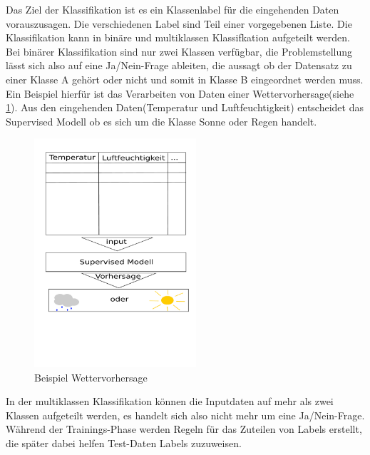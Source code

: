 	Das Ziel der Klassifikation ist es ein Klassenlabel für die eingehenden Daten vorauszusagen. Die verschiedenen Label sind Teil einer vorgegebenen Liste. \cite{Mueller2016} Die Klassifikation kann in binäre und multiklassen Klassifkation aufgeteilt werden. Bei binärer Klassifikation sind nur zwei Klassen verfügbar, die Problemstellung lässt sich also auf eine Ja/Nein-Frage ableiten, die aussagt ob der Datensatz zu einer Klasse A gehört oder nicht und somit in Klasse B eingeordnet werden muss. Ein Beispiel hierfür ist das Verarbeiten von Daten einer Wettervorhersage(siehe \ref{fig:abb1}). Aus den eingehenden Daten(Temperatur und Luftfeuchtigkeit) entscheidet das Supervised Modell ob es sich um die Klasse Sonne oder Regen handelt.  \cite{Mueller2016}\newline 
		\begin{figure}[H]
			\centering
			\includegraphics[width=6cm]{Bilder/Label.pdf}
			\caption{Beispiel Wettervorhersage \cite{Sarkar2018}}
			\label{fig:abb1}
		\end{figure}
		
	In der multiklassen Klassifikation können die Inputdaten auf mehr als zwei Klassen aufgeteilt werden, es handelt sich also nicht mehr um eine Ja/Nein-Frage. \cite{Mueller2016} Während der Trainings-Phase werden Regeln für das Zuteilen von Labels erstellt, die später dabei helfen Test-Daten Labels zuzuweisen.  \cite{Suthaharan2016}
	
